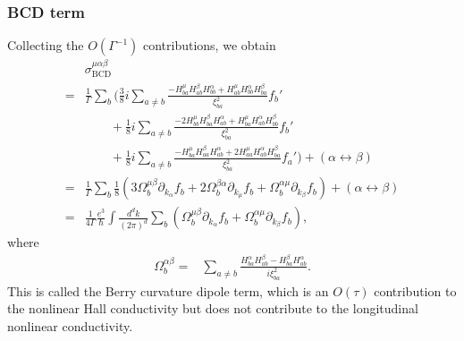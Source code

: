 \documentclass[twocolumn,superscriptaddress]{revtex4-1}
\newcommand{\smrm}[1]{_{\mathrm{#1}}}
\begin{document}
\subsubsection{BCD term}
Collecting the $O(\Gamma^{-1})$ contributions, we obtain
\begin{align}
&\sigma\smrm{BCD}^{\mu\alpha\beta}\nonumber\\
=&\frac{1}{\Gamma}\sum_b\Biggl(\frac{3}{8}i\sum_{a\neq b}\frac{-H_{ba}^\mu H_{ab}^\beta H_{bb}^\alpha+H_{ab}^\mu H_{bb}^\alpha H_{ba}^\beta}{\xi_{ba}^2}f_b' \nonumber \\
&\qquad +\frac{1}{8}i\sum_{a\neq b}\frac{-2H_{bb}^\mu H_{ba}^\beta H_{ab}^\alpha+H_{ba}^\mu H_{ab}^\alpha H_{bb}^\beta}{\xi_{ba}^2}f_b' \nonumber \\
&\qquad +\frac{1}{8}i\sum_{a\neq b}\frac{-H_{ba}^\mu H_{aa}^\beta H_{ab}^\alpha+2H_{aa}^\mu H_{ab}^\alpha H_{ba}^\beta}{\xi_{ba}^2}f_a'\Biggl)+(\alpha \leftrightarrow \beta) \nonumber \\
=&\frac{1}{\Gamma}\sum_b \frac{1}{8}(3\Omega_b^{\mu\beta}\partial_{k_\alpha} f_b+2\Omega_b^{\beta\alpha}\partial_{k_\mu} f_b+\Omega_b^{\alpha\mu}\partial_{k_\beta} f_b) +(\alpha \leftrightarrow \beta) \nonumber \\
=&\frac{1}{4\Gamma}\frac{e^3}{\hbar}\int \frac{d^d k}{(2\pi)^d}\sum_b (\Omega_b^{\mu\beta}\partial_{k_\alpha} f_b+\Omega_b^{\alpha\mu}\partial_{k_\beta} f_b),
\end{align}
where
\begin{align}
\Omega_b^{\alpha\beta}=&\sum_{a\neq b}\frac{H_{ba}^\alpha H_{ab}^\beta-H_{ba}^\beta H_{ab}^\alpha}{i\xi_{ba}^2}. 
\end{align}
This is called the Berry curvature dipole term, which is an $O(\tau)$ contribution to the nonlinear Hall conductivity but does not contribute to the longitudinal nonlinear conductivity.
\end{document}
